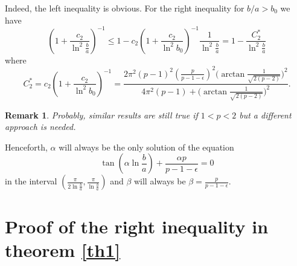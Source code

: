 \documentclass[10pt,a4paper]{amsart}
\newtheorem{remark}[theorem]{Remark}
\numberwithin{equation}{section}
\begin{document}
Indeed, the left inequality is obvious. For the right inequality  for 
$b/a>b_0$ we have
\[
 \left(1+\frac{c_2}{\ln^2 \frac{b}{a}}\right)^{-1}
 \le 1-c_2 \left(1+\frac{c_2}{\ln^2 b_0}\right)^{-1}
 \frac{1}{\ln^2 \frac{b}{a}}=1 -\frac{C_2^*}{\ln^2 \frac{b}{a}}
\]
where
\[
C_2^* = c_2 \left(1+\frac{c_2}{\ln^2 b_0}\right)^{-1}=
\frac{2\pi^2(p-1)^2 \left(\frac{p}{p-1-\epsilon}\right)^2
\Big( \arctan{\frac{1}{\sqrt{2(p-2)}} }\Big)^2}{4\pi^2(p-1)+\Big( \arctan{\frac{1}{\sqrt{2(p-2)}} }\Big)^2}.
\]










\begin{remark}
Probably, similar results are still true if $1<p<2$ but a different approach is needed.
\end{remark}



Henceforth, $\alpha$ will always be the only solution of the equation
\[
\tan\left(\alpha\ln \frac{b}{a} \right)+\frac{\alpha p}{p-1-\epsilon}=0
\]
in the interval $\left(\frac{\pi}{2\ln \frac{b}{a}},\frac{\pi}{\ln \frac{b}{a}} \right)$ and $\beta$ will always be $\beta =\frac{p}{p-1-\epsilon}$.


 
\section{Proof of the right inequality in theorem \ref{th1}}
\end{document}
